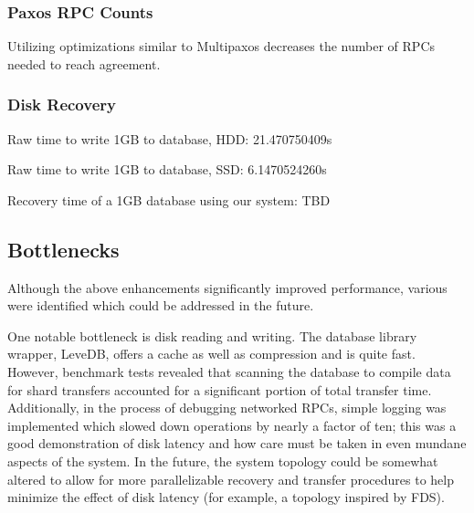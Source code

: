 \documentclass[letterpaper,10pt]{article}
\begin{document}
\subsubsection{Paxos RPC Counts}

Utilizing optimizations similar to Multipaxos decreases the number of RPCs needed to reach agreement.

\begin{table}[h]
\centering
{}
\end{table}

\subsubsection{Disk Recovery}
Raw time to write 1GB to database, HDD:  21.470750409s

Raw time to write 1GB to database, SSD:  6.1470524260s

Recovery time of a 1GB database using our system: TBD

\subsection{Bottlenecks}
Although the above enhancements significantly improved performance, various were identified which could be addressed in the future.

One notable bottleneck is disk reading and writing.  The database library wrapper, LeveDB, offers a cache as well as compression and is quite fast.  However, benchmark tests revealed that scanning the database to compile data for shard transfers accounted for a significant portion of total transfer time.  Additionally, in the process of debugging networked RPCs, simple logging was implemented which slowed down operations by nearly a factor of ten; this was a good demonstration of disk latency and how care must be taken in even mundane aspects of the system.  In the future, the system topology could be somewhat altered to allow for more parallelizable recovery and transfer procedures to help minimize the effect of disk latency (for example, a topology inspired by FDS).
\end{document}
